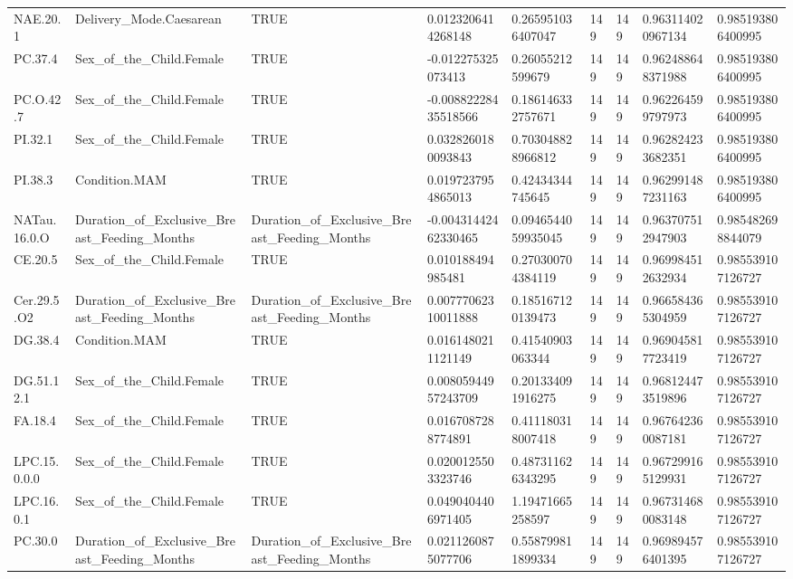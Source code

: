 \begin{longtable}{lllllllll}
NAE.20.1 & Delivery\_Mode.Caesarean & TRUE & 0.0123206414268148 & 0.265951036407047 & 149 & 149 & 0.963114020967134 & 0.985193806400995 \\
PC.37.4 & Sex\_of\_the\_Child.Female & TRUE & -0.012275325073413 & 0.26055212599679 & 149 & 149 & 0.962488648371988 & 0.985193806400995 \\
PC.O.42.7 & Sex\_of\_the\_Child.Female & TRUE & -0.00882228435518566 & 0.186146332757671 & 149 & 149 & 0.962264599797973 & 0.985193806400995 \\
PI.32.1 & Sex\_of\_the\_Child.Female & TRUE & 0.0328260180093843 & 0.703048828966812 & 149 & 149 & 0.962824233682351 & 0.985193806400995 \\
PI.38.3 & Condition.MAM & TRUE & 0.0197237954865013 & 0.42434344745645 & 149 & 149 & 0.962991487231163 & 0.985193806400995 \\
NATau.16.0.O & Duration\_of\_Exclusive\_Breast\_Feeding\_Months & Duration\_of\_Exclusive\_Breast\_Feeding\_Months & -0.00431442462330465 & 0.0946544059935045 & 149 & 149 & 0.963707512947903 & 0.985482698844079 \\
CE.20.5 & Sex\_of\_the\_Child.Female & TRUE & 0.010188494985481 & 0.270300704384119 & 149 & 149 & 0.969984512632934 & 0.985539107126727 \\
Cer.29.5.O2 & Duration\_of\_Exclusive\_Breast\_Feeding\_Months & Duration\_of\_Exclusive\_Breast\_Feeding\_Months & 0.00777062310011888 & 0.185167120139473 & 149 & 149 & 0.966584365304959 & 0.985539107126727 \\
DG.38.4 & Condition.MAM & TRUE & 0.0161480211121149 & 0.41540903063344 & 149 & 149 & 0.969045817723419 & 0.985539107126727 \\
DG.51.12.1 & Sex\_of\_the\_Child.Female & TRUE & 0.00805944957243709 & 0.201334091916275 & 149 & 149 & 0.968124473519896 & 0.985539107126727 \\
FA.18.4 & Sex\_of\_the\_Child.Female & TRUE & 0.0167087288774891 & 0.411180318007418 & 149 & 149 & 0.967642360087181 & 0.985539107126727 \\
LPC.15.0.0.0 & Sex\_of\_the\_Child.Female & TRUE & 0.0200125503323746 & 0.487311626343295 & 149 & 149 & 0.967299165129931 & 0.985539107126727 \\
LPC.16.0.1 & Sex\_of\_the\_Child.Female & TRUE & 0.0490404406971405 & 1.19471665258597 & 149 & 149 & 0.967314680083148 & 0.985539107126727 \\
PC.30.0 & Duration\_of\_Exclusive\_Breast\_Feeding\_Months & Duration\_of\_Exclusive\_Breast\_Feeding\_Months & 0.0211260875077706 & 0.558799811899334 & 149 & 149 & 0.969894576401395 & 0.985539107126727 \\

\end{longtable}

